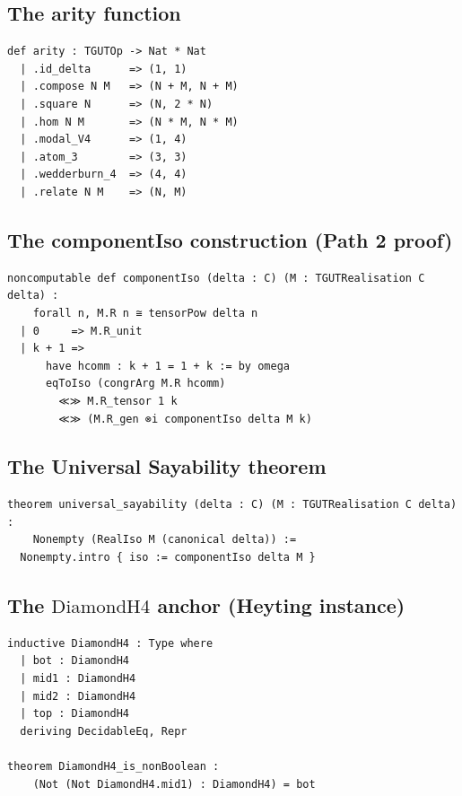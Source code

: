 \documentclass[11pt,a4paper]{article}
\theoremstyle{plain}
\theoremstyle{definition}
\theoremstyle{remark}
\newcommand{\DiamondH}{\mathrm{DiamondH4}}
\begin{document}
\subsection{The arity function}\label{app:lean:arity}

\begin{lstlisting}[language=Lean]
def arity : TGUTOp -> Nat * Nat
  | .id_delta      => (1, 1)
  | .compose N M   => (N + M, N + M)
  | .square N      => (N, 2 * N)
  | .hom N M       => (N * M, N * M)
  | .modal_V4      => (1, 4)
  | .atom_3        => (3, 3)
  | .wedderburn_4  => (4, 4)
  | .relate N M    => (N, M)
\end{lstlisting}

\subsection{The componentIso construction (Path 2 proof)}\label{app:lean:component}

\begin{lstlisting}[language=Lean]
noncomputable def componentIso (delta : C) (M : TGUTRealisation C delta) :
    forall n, M.R n ≅ tensorPow delta n
  | 0     => M.R_unit
  | k + 1 =>
      have hcomm : k + 1 = 1 + k := by omega
      eqToIso (congrArg M.R hcomm)
        ≪≫ M.R_tensor 1 k
        ≪≫ (M.R_gen ⊗i componentIso delta M k)
\end{lstlisting}

\subsection{The Universal Sayability theorem}\label{app:lean:us}

\begin{lstlisting}[language=Lean]
theorem universal_sayability (delta : C) (M : TGUTRealisation C delta) :
    Nonempty (RealIso M (canonical delta)) :=
  Nonempty.intro { iso := componentIso delta M }
\end{lstlisting}

\subsection{The $\DiamondH$ anchor (Heyting instance)}\label{app:lean:diamondH4}

\begin{lstlisting}[language=Lean]
inductive DiamondH4 : Type where
  | bot : DiamondH4
  | mid1 : DiamondH4
  | mid2 : DiamondH4
  | top : DiamondH4
  deriving DecidableEq, Repr

theorem DiamondH4_is_nonBoolean :
    (Not (Not DiamondH4.mid1) : DiamondH4) = bot
\end{lstlisting}
\end{document}
